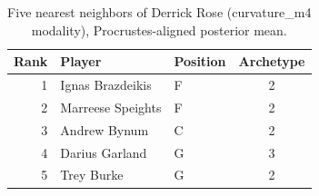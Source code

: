 \begin{table}[htbp]
  \centering\small
  \begin{tabular}{rllc}
    \toprule
    Rank & Player & Position & Archetype \\
    \midrule
    1 & Ignas Brazdeikis & F & 2 \\
    2 & Marreese Speights & F & 2 \\
    3 & Andrew Bynum & C & 2 \\
    4 & Darius Garland & G & 3 \\
    5 & Trey Burke & G & 2 \\
    \bottomrule
  \end{tabular}
  \caption{Five nearest neighbors of Derrick Rose (curvature_m4 modality), Procrustes-aligned posterior mean.}
  \label{tab:Derrick_Rose_neighbors_curvature_m4}
\end{table}

